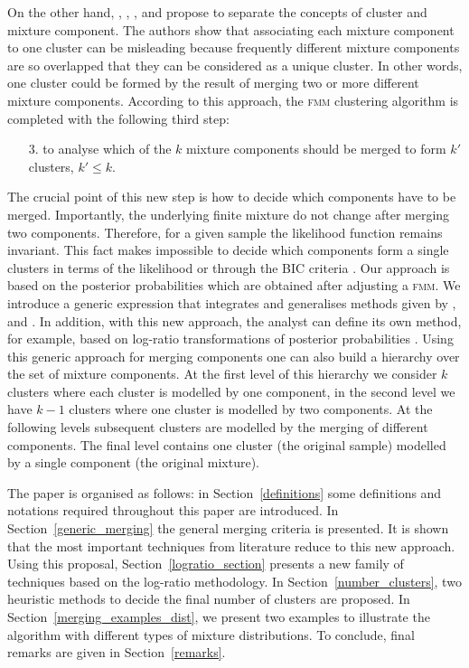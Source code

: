 \documentclass[submit]{smj}
\theoremstyle{definition}
\newcommand{\fmm}{\textsc{fmm}\xspace}
\begin{document}
On the other hand, \cite{lee2004combining}, \cite{hennig2010methods}, \cite{baudry2010combining}, \cite{melnykov2013distribution} and \cite{pastore2013merging} propose to separate the concepts of cluster and mixture component. The authors show that associating each mixture component to one cluster can be misleading because frequently different mixture components are so overlapped that they can be considered as a unique cluster. In other words, one cluster could be formed by the result of merging two or more different mixture components. According to this approach, the \fmm clustering algorithm is completed with the following third step:

\begin{itemize}
\item[3.] to analyse which of the $k$ mixture components should be merged to form $k'$ clusters, $k' \leq k$.
\end{itemize}

The crucial point of this new step is how to decide which components have to be merged. Importantly, the underlying finite mixture do not change after merging two components. Therefore, for a given sample the likelihood function remains invariant. This fact makes impossible to decide which components form a single clusters in terms of the likelihood or through the BIC criteria \citep{hennig2010methods}. Our approach is based on the posterior probabilities which are obtained after adjusting a \fmm. We introduce a generic expression that integrates and generalises methods given by \cite{baudry2010combining}, \cite{hennig2010methods} and \cite{longford2014}. In addition, with this new approach, the analyst can define its own method, for example, based on log-ratio transformations of posterior probabilities \citep{aitchison1986statistical}. 
Using this generic approach for merging components one can also build a hierarchy over the set of mixture components. At the first level of this hierarchy we consider $k$ clusters where each cluster is modelled by one component, in the second level we have $k-1$ clusters where one cluster is modelled by two components. At the following levels subsequent clusters are modelled by the merging of different components. The final level contains one cluster (the original sample) modelled by a single component (the original mixture).

The paper is organised as follows: in Section~\ref{definitions} some definitions and notations required throughout this paper are introduced. In Section~\ref{generic_merging} the general merging criteria is presented. It is shown that the most important techniques from literature reduce to this new approach. Using this proposal, Section~\ref{logratio_section} presents a new family of techniques based on the log-ratio methodology. In Section~\ref{number_clusters}, two heuristic methods to decide the final number of clusters are proposed. In Section~\ref{merging_examples_dist}, we present two examples to illustrate the algorithm with different types of mixture distributions. To conclude, final remarks are given in Section~\ref{remarks}.
\end{document}
